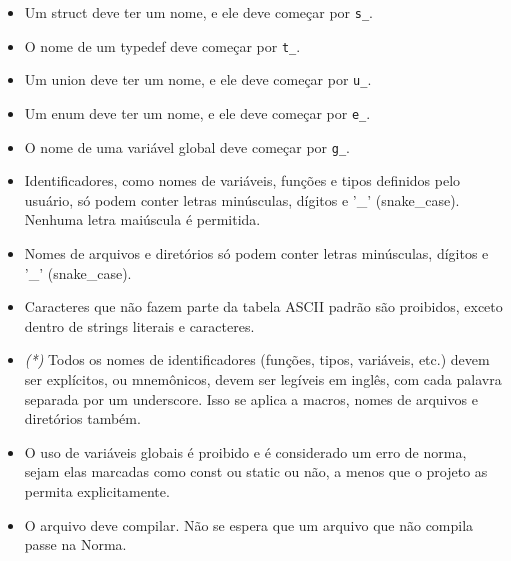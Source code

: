 \documentclass{42-pt}
\begin{document}
        \begin{itemize}

            \item Um struct deve ter um nome, e ele deve começar por
                \texttt{s\_}.

            \item O nome de um typedef deve começar por
                \texttt{t\_}.

            \item Um union deve ter um nome, e ele deve começar por \texttt{u\_}.

            \item Um enum deve ter um nome, e ele deve começar por \texttt{e\_}.

            \item O nome de uma variável global deve começar por \texttt{g\_}.
            
           \item Identificadores, como nomes de variáveis, funções e tipos definidos pelo usuário,
                só podem conter letras minúsculas, dígitos e '\_' (snake\_case). Nenhuma letra maiúscula é permitida.

            \item Nomes de arquivos e diretórios só podem conter letras minúsculas, dígitos e
                '\_' (snake\_case).

            \item Caracteres que não fazem parte da tabela ASCII padrão são proibidos, exceto dentro de strings literais e caracteres.

            \item \textit{(*)} Todos os nomes de identificadores (funções, tipos,
                variáveis, etc.) devem ser explícitos, ou mnemônicos,
                devem ser legíveis em inglês, com cada palavra separada por um underscore.
                Isso se aplica a macros, nomes de arquivos e diretórios também.

            \item O uso de variáveis globais é proibido e é considerado um erro de norma,
                sejam elas marcadas como const ou static ou não, a menos que o projeto as
                permita explicitamente.

            \item O arquivo deve compilar. Não se espera que um arquivo que não compila
                passe na Norma.
        \end{itemize}
\newpage
\end{document}
